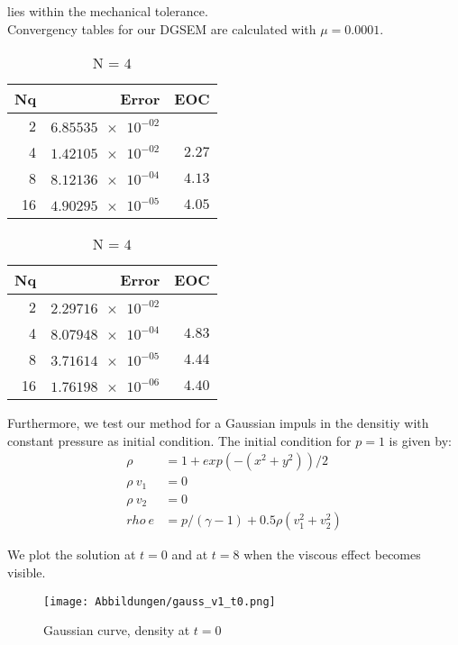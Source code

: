 \documentclass[11pt]{scrartcl}
\begin{document}
lies within the mechanical tolerance.\\

Convergency tables for our DGSEM are calculated with $\mu=0.0001$.

\begin{table}[H]
\parbox{.45\linewidth}{
\centering
    \begin{tabular}{|r|r|r|}
    \hline\hline
    \textbf{Nq} & \textbf{Error} & \textbf{EOC} \\\hline
    2 & $\num{6.85535e-02}$ &  \\
    4 & $\num{1.42105e-02}$ & $\num{2.27}$ \\
    8 & $\num{8.12136e-04}$ & $\num{4.13}$ \\
    16 & $\num{4.90295e-05}$ & $\num{4.05}$ \\\hline\hline
  \end{tabular} 
  \caption{N = $3$}
  }
  \hspace{0.5cm}
  \parbox{.45\linewidth}{
	\centering
    \begin{tabular}{|r|r|r|}
    \hline\hline
    \textbf{Nq} & \textbf{Error} & \textbf{EOC} \\\hline
    2 & $\num{2.29716e-02}$ &  \\
    4 & $\num{8.07948e-04}$ & $\num{4.83}$ \\
    8 & $\num{3.71614e-05}$ & $\num{4.44}$ \\
    16 & $\num{1.76198e-06}$ & $\num{4.40}$ \\\hline\hline
  \end{tabular}
   \caption{N = $4$}
  }
\end{table}

Furthermore, we test our method for a Gaussian impuls in the densitiy with constant pressure as initial condition.
The initial condition for $p=1$ is given by:
\begin{align*}
	\rho &= 1 + exp(-(x^2 + y^2)) / 2 \\
	\rho \ v_1 &= 0 \\
	\rho \ v_2 &= 0 \\
	rho \ e &= p / (\gamma - 1) + 0.5 \rho (v_1^2 + v_2^2)
\end{align*}

We plot the solution at $t=0$ and at $t=8$ when the viscous effect becomes visible. 
\begin{figure}[H]
	\centering
	\texttt{[image: Abbildungen/gauss\_v1\_t0.png]}
	\caption{Gaussian curve, density at $t=0$}
	\label{gaust0}
\end{figure}
 
\end{document}
